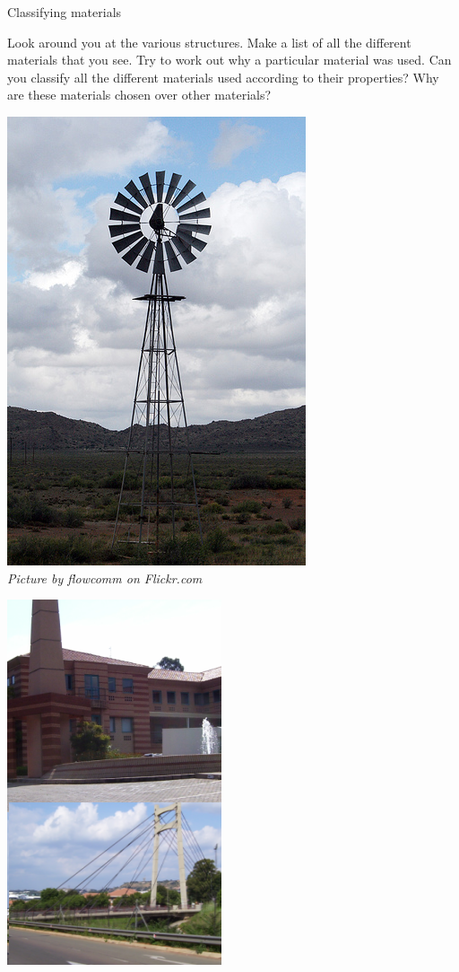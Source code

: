 \begin{activity}{Classifying materials} {
\begin{minipage}{.4\textwidth}
Look around you at the various structures. Make a list of all the different materials that you see. Try to work out why a particular material was used. Can you classify all the different materials used according to their properties? Why are these materials chosen over other materials?
\end{minipage}
\begin{minipage}{.25\textwidth}
\begin{center}
 \includegraphics[height=.8\textwidth]{photos/windmillby-flowcomm-flickr.jpg}\\
\textit{Picture by flowcomm on Flickr.com}
\end{center}
\end{minipage}
\begin{minipage}{.25\textwidth}
\begin{center}
 \includegraphics[height=.8\textwidth]{photos/materials.png}
\end{center}
\end{minipage}
}
\end{activity}


